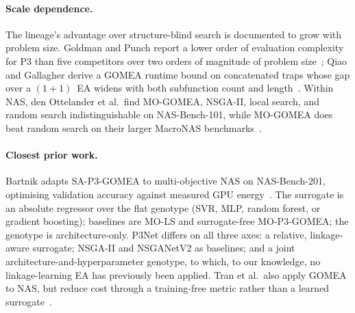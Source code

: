 \paragraph{Scale dependence.} The lineage's advantage over structure-blind search is documented to grow with
problem size. Goldman and Punch report a lower order of evaluation complexity for P3 than five competitors over
two orders of magnitude of problem size~\citep{goldman2015fast}; Qiao and Gallagher derive a GOMEA runtime bound
on concatenated traps whose gap over a $(1{+}1)$~EA widens with both subfunction count and
length~\citep{qiao2024gomearuntime}. Within NAS, den Ottelander et al.\ find MO-GOMEA, NSGA-II, local search, and
random search indistinguishable on NAS-Bench-101, while MO-GOMEA does beat random search on their larger MacroNAS
benchmarks~\citep{denottelander2021localsearch}.

\paragraph{Closest prior work.} Bartnik adapts SA-P3-GOMEA to multi-objective NAS on NAS-Bench-201, optimising
validation accuracy against measured GPU energy~\citep{bartnik2026evolutionary}. The surrogate is an absolute
regressor over the flat genotype (SVR, MLP, random forest, or gradient boosting); baselines are MO-LS and
surrogate-free MO-P3-GOMEA; the genotype is architecture-only. P3Net differs on all three axes: a relative,
linkage-aware surrogate; NSGA-II and NSGANetV2 as baselines; and a joint architecture-and-hyperparameter genotype,
to which, to our knowledge, no linkage-learning EA has previously been applied. Tran et al.\ also apply GOMEA to
NAS, but reduce cost through a training-free metric rather than a learned surrogate~\citep{tran2023gomeanas}.

